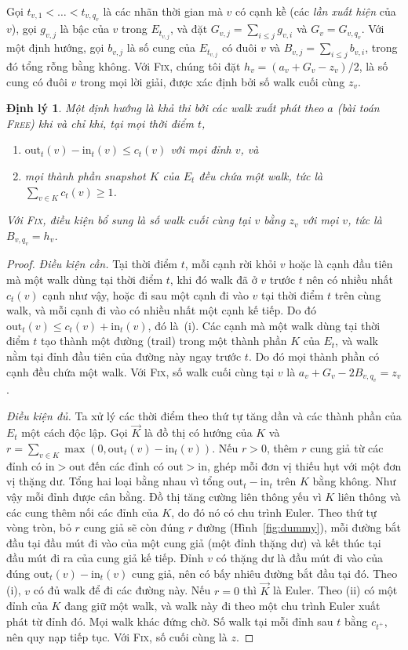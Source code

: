 \documentclass[pdflatex,sn-mathphys-num]{sn-jnl}
\theoremstyle{thmstyleone}
\newtheorem{theorem}{Định lý}
\theoremstyle{thmstyletwo}
\theoremstyle{thmstylethree}
\newcommand{\out}{\mathrm{out}}
\newcommand{\inn}{\mathrm{in}}
\newcommand{\FIX}{\textup{\textsc{Fix}}}
\newcommand{\FREE}{\textup{\textsc{Free}}}
\begin{document}
Gọi $t_{v,1}<\dots<t_{v,q_v}$ là các nhãn thời gian mà $v$ có cạnh kề (các \emph{lần xuất hiện} của $v$), gọi $g_{v,j}$ là bậc của $v$ trong $E_{t_{v,j}}$, và đặt $G_{v,j}=\sum_{i\le j}g_{v,i}$ và $G_v=G_{v,q_v}$. Với một định hướng, gọi $b_{v,j}$ là số cung của $E_{t_{v,j}}$ có đuôi $v$ và $B_{v,j}=\sum_{i\le j}b_{v,i}$, trong đó tổng rỗng bằng không. Với \FIX{}, chúng tôi đặt $h_v=(a_v+G_v-z_v)/2$, là số cung có đuôi $v$ trong mọi lời giải, được xác định bởi số walk cuối cùng $z_v$.

\begin{theorem}\label{thm:char}
Một định hướng là khả thi bởi các walk xuất phát theo $a$ (bài toán \FREE{}) khi và chỉ khi, tại mọi thời điểm $t$,
\begin{enumerate}
\item[(i)] $\out_t(v)-\inn_t(v)\le c_t(v)$ với mọi đỉnh $v$, và
\item[(ii)] mọi thành phần snapshot $K$ của $E_t$ đều chứa một walk, tức là $\sum_{v\in K}c_t(v)\ge 1$.
\end{enumerate}
Với \FIX{}, điều kiện bổ sung là số walk cuối cùng tại $v$ bằng $z_v$ với mọi $v$, tức là $B_{v,q_v}=h_v$.
\end{theorem}

\begin{proof}
\emph{Điều kiện cần.} Tại thời điểm $t$, mỗi cạnh rời khỏi $v$ hoặc là cạnh đầu tiên mà một walk dùng tại thời điểm $t$, khi đó walk đã ở $v$ trước $t$ nên có nhiều nhất $c_t(v)$ cạnh như vậy, hoặc đi sau một cạnh đi vào $v$ tại thời điểm $t$ trên cùng walk, và mỗi cạnh đi vào có nhiều nhất một cạnh kế tiếp. Do đó $\out_t(v)\le c_t(v)+\inn_t(v)$, đó là~(i). Các cạnh mà một walk dùng tại thời điểm $t$ tạo thành một đường (trail) trong một thành phần $K$ của $E_t$, và walk nằm tại đỉnh đầu tiên của đường này ngay trước $t$. Do đó mọi thành phần có cạnh đều chứa một walk. Với \FIX{}, số walk cuối cùng tại $v$ là $a_v+G_v-2B_{v,q_v}=z_v$.

\emph{Điều kiện đủ.} Ta xử lý các thời điểm theo thứ tự tăng dần và các thành phần của $E_t$ một cách độc lập. Gọi $\vec K$ là đồ thị có hướng của $K$ và $r=\sum_{v\in K}\max(0,\out_t(v)-\inn_t(v))$. Nếu $r>0$, thêm $r$ cung giả từ các đỉnh có $\inn>\out$ đến các đỉnh có $\out>\inn$, ghép mỗi đơn vị thiếu hụt với một đơn vị thặng dư. Tổng hai loại bằng nhau vì tổng $\out_t-\inn_t$ trên $K$ bằng không. Như vậy mỗi đỉnh được cân bằng. Đồ thị tăng cường liên thông yếu vì $K$ liên thông và các cung thêm nối các đỉnh của $K$, do đó nó có chu trình Euler. Theo thứ tự vòng tròn, bỏ $r$ cung giả sẽ còn đúng $r$ đường (Hình~\ref{fig:dummy}), mỗi đường bắt đầu tại đầu mút đi vào của một cung giả (một đỉnh thặng dư) và kết thúc tại đầu mút đi ra của cung giả kế tiếp. Đỉnh $v$ có thặng dư là đầu mút đi vào của đúng $\out_t(v)-\inn_t(v)$ cung giả, nên có bấy nhiêu đường bắt đầu tại đó. Theo (i), $v$ có đủ walk để đi các đường này. Nếu $r=0$ thì $\vec K$ là Euler. Theo (ii) có một đỉnh của $K$ đang giữ một walk, và walk này đi theo một chu trình Euler xuất phát từ đỉnh đó. Mọi walk khác đứng chờ. Số walk tại mỗi đỉnh sau $t$ bằng $c_{t^+}$, nên quy nạp tiếp tục. Với \FIX{}, số cuối cùng là $z$.
\end{proof}
\end{document}
